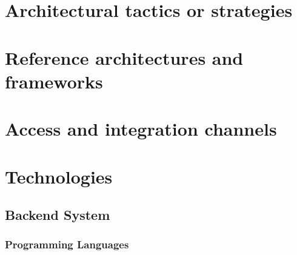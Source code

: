 \documentclass[a4paper,10pt]{article}
\begin{document}
\section{Architectural tactics or strategies}
 
\section{Reference architectures and frameworks}
 
\section{Access and integration channels}

\section{Technologies}
\subsection{Backend System}
\subsubsection{Programming Languages}
\end{document}
